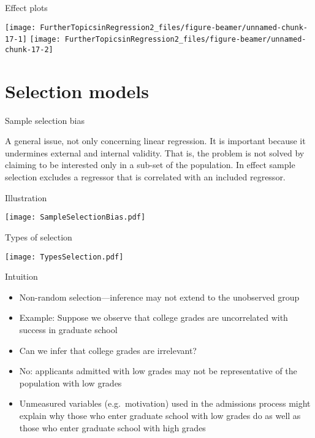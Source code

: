 \documentclass[10pt,ignorenonframetext,]{beamer}
\providecommand{\tightlist}{%
\setlength{\itemsep}{0pt}\setlength{\parskip}{0pt}}
\begin{document}
\begin{frame}{Effect plots}

\texttt{[image: FurtherTopicsinRegression2\_files/figure-beamer/unnamed-chunk-17-1]}
\texttt{[image: FurtherTopicsinRegression2\_files/figure-beamer/unnamed-chunk-17-2]}

\end{frame}

\section{Selection models}\label{selection-models}

\begin{frame}{Sample selection bias}

A general issue, not only concerning linear regression. It is important
because it undermines external and internal validity. That is, the
problem is not solved by claiming to be interested only in a sub-set of
the population. In effect sample selection excludes a regressor that is
correlated with an included regressor.

\end{frame}

\begin{frame}{Illustration}

\texttt{[image: SampleSelectionBias.pdf]}

\end{frame}

\begin{frame}{Types of selection}

\texttt{[image: TypesSelection.pdf]}

\end{frame}

\begin{frame}{Intuition}

\begin{itemize}
\tightlist
\item
  Non-random selection---inference may not extend to the unobserved
  group
\item
  Example: Suppose we observe that college grades are uncorrelated with
  success in graduate school
\item
  Can we infer that college grades are irrelevant?
\item
  No: applicants admitted with low grades may not be representative of
  the population with low grades
\item
  Unmeasured variables (e.g.~motivation) used in the admissions process
  might explain why those who enter graduate school with low grades do
  as well as those who enter graduate school with high grades
\end{itemize}

\end{frame}
\end{document}
